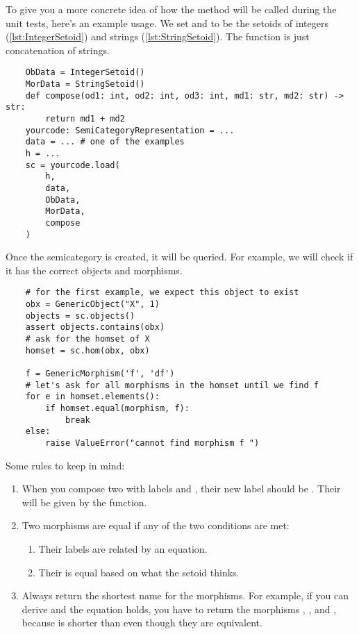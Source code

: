 To give you a more concrete idea of how the method will be called during the unit tests, here's an example usage.
We set   and  to be the setoids of integers (\cref{lst:IntegerSetoid}) and strings (\cref{lst:StringSetoid}).
The  function is just concatenation of strings.

\begin{verbatim}
    ObData = IntegerSetoid()
    MorData = StringSetoid()
    def compose(od1: int, od2: int, od3: int, md1: str, md2: str) -> str:
        return md1 + md2
    yourcode: SemiCategoryRepresentation = ...
    data = ... # one of the examples
    h = ...
    sc = yourcode.load(
        h,
        data,
        ObData,
        MorData,
        compose
    )
\end{verbatim}

Once the semicategory is created, it will be queried.
For example, we will check if it has the correct objects and morphisms.

\begin{verbatim}
    # for the first example, we expect this object to exist
    obx = GenericObject("X", 1)
    objects = sc.objects()
    assert objects.contains(obx)
    # ask for the homset of X
    homset = sc.hom(obx, obx)

    f = GenericMorphism('f', 'df')
    # let's ask for all morphisms in the homset until we find f
    for e in homset.elements():
        if homset.equal(morphism, f):
            break
    else:
        raise ValueError("cannot find morphism f ")
\end{verbatim}




Some rules to keep in mind:

\begin{enumerate}
    \item When you compose two  with labels  and , their new label should be .
          Their  will be given by the  function.
    \item Two morphisms are equal if any of the two conditions are met:
          \begin{enumerate}
              \item Their labels are related by an equation.
              \item Their  is equal based on what the setoid  thinks.
          \end{enumerate}
    \item Always return the shortest name for the morphisms.
          For example, if you can derive  and the equation  holds, you have to return the morphisms , , and , because  is shorter than  even though they are equivalent.
\end{enumerate}

